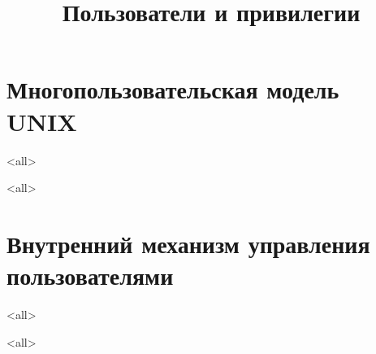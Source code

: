 
\title{Пользователи и привилегии}




\newcommand{\defaultuser}{cur\_user}



\begin{frame}
	\frametitle{}
	\titlepage
	\vspace{-0.5cm}
	\begin{center}
	\end{center}
\end{frame}
\section{Многопользовательская модель UNIX}
\mode<all>{}

\mode<all>{}
\section{Внутренний механизм управления пользователями}
\mode<all>{}

\mode<all>{}


